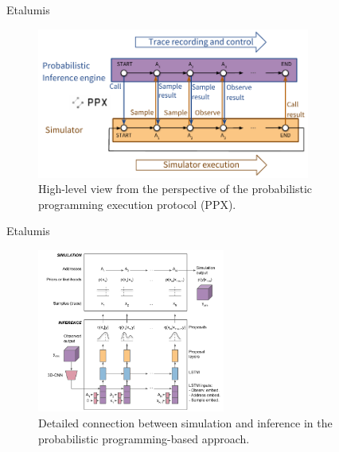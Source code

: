 \documentclass[AERbeamer%
              ,optEnglish%
              ,optBiber%
              ,optBibstyleAlphabetic%
              ,optBeamerClassicFormat%
              ]{AERlatex}%
\begin{document}
\begin{frame}[c]{Etalumis}
    \centering
    \begin{figure}
        \centering
        \includegraphics[width=0.8\textwidth]{PPXTrace.png}
        \caption{High-level view from the perspective of the probabilistic programming execution protocol (PPX).}
    \end{figure}
\end{frame}


\begin{frame}[c]{Etalumis}
    \centering
    \begin{figure}
        \centering
        \includegraphics[width=0.549\textwidth]{ETALUMISSimulationandInference.png}
        \caption{Detailed connection between simulation and inference in the probabilistic programming-based approach.}
    \end{figure}
\end{frame}
\end{document}
